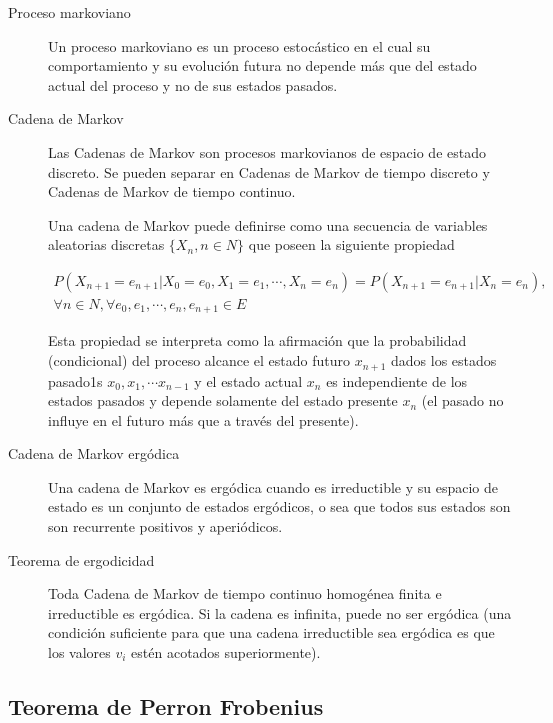 \documentclass{article}
\begin{document}
\begin{description} 
\item[Proceso markoviano] Un proceso markoviano es un proceso estocástico en el cual su comportamiento y su evolución futura no depende más que del estado actual del proceso y no de sus estados pasados. 

\item[ Cadena de Markov] Las Cadenas de Markov son procesos markovianos de espacio de estado discreto. Se pueden separar en Cadenas de Markov de tiempo discreto y Cadenas de Markov de tiempo continuo.

Una cadena de Markov puede definirse como una secuencia de variables aleatorias discretas  $\{X_n , n\in N \}$ que poseen la siguiente propiedad 

\begin{equation} \label{eq:markov}
\begin{split}
P(X_{n+1} = e_{n+1} | X_0 =e_0,X_1 =e_1, \cdots ,X_n =e_n) = P(X_{n+1} = e_{n+1} |X_n =e_n),  \\
\forall n \in N,\forall e_0,e_1, \cdots, e_n,e_{n+1} \in E
\end{split}
\end{equation}

Esta propiedad se interpreta como la afirmación que la probabilidad (condicional) del proceso alcance el estado futuro $x_{n+1}$ dados los estados pasado1s $x_0, x_1, \cdots x_{n-1}$ y el estado actual $x_n$ es independiente de los estados pasados y depende solamente del estado presente $x_n$ (el pasado no influye en el futuro más que a través del presente).

\item[Cadena de Markov ergódica] Una cadena de Markov es ergódica cuando es irreductible y su espacio de estado es un conjunto de estados ergódicos, o sea que todos sus estados son son recurrente positivos y aperiódicos.

\item[Teorema de ergodicidad] Toda Cadena de Markov de tiempo continuo homogénea finita e irreductible es ergódica. Si la cadena es infinita, puede no ser ergódica (una condición suficiente para que una cadena irreductible sea ergódica es que los valores $v_i$ estén acotados superiormente).

\end{description}

\subsection{Teorema de Perron Frobenius}
\end{document}

